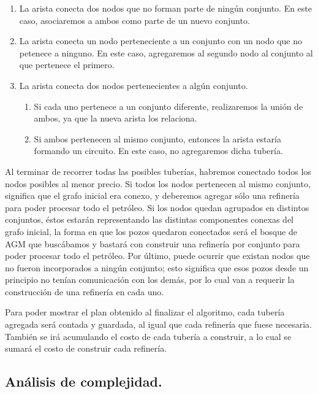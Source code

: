 \begin{enumerate}
	\item La arista conecta dos nodos que no forman parte de ningún conjunto.  En este caso, asociaremos a ambos como parte de un nuevo conjunto.
	\item La arista conecta un nodo perteneciente a un conjunto con un nodo que no petenece a ninguno.  En este caso, agregaremos al segundo nodo al conjunto al que pertenece el primero.
	\item La arista conecta dos nodos pertenecientes a algún conjunto.
	
	\begin{enumerate}
		\item Si cada uno pertenece a un conjunto diferente, realizaremos la unión de ambos, ya que la nueva arista los relaciona.
		\item Si ambos pertenecen al mismo conjunto, entonces la arista estaría formando un circuito.  En este caso, no agregaremos dicha tubería.
	\end{enumerate}
\end{enumerate}

Al terminar de recorrer todas las posibles tuberías, habremos conectado todos los nodos posibles al menor precio.  Si todos los nodos pertenecen al mismo conjunto, significa que el grafo inicial era conexo, y deberemos agregar sólo una refinería para poder procesar todo el petróleo.  Si los nodos quedan agrupados en distintos conjuntos, éstos estarán representando las distintas componentes conexas del grafo inicial, la forma en que los pozos quedaron conectados será el bosque de AGM que buscábamos y bastará con construir una refinería por conjunto para poder procesar todo el petróleo.  Por último, puede ocurrir que existan nodos que no fueron incorporados a ningún conjunto; esto significa que esos pozos desde un principio no tenían comunicación con los demás, por lo cual van a requerir la construcción de una refinería en cada uno.

Para poder mostrar el plan obtenido al finalizar el algoritmo, cada tubería agregada será contada y guardada, al igual que cada refinería que fuese necesaria.  También se irá acumulando el costo de cada tubería a construir, a lo cual se sumará el costo de construir cada refinería.

\vspace*{0.6cm}

\subsection{Análisis de complejidad.}

